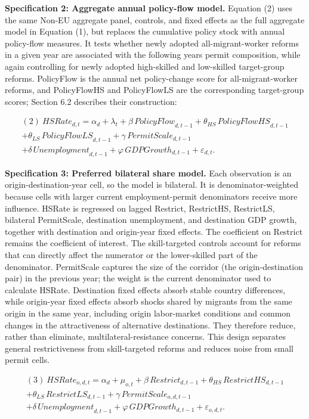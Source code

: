\documentclass[11pt,a4paper]{article}
\begin{document}
\textbf{Specification 2: Aggregate annual policy-flow model.} Equation
(2) uses the same Non-EU aggregate panel, controls, and fixed effects as
the full aggregate model in Equation (1), but replaces the cumulative
policy stock with annual policy-flow measures. It tests whether newly
adopted all-migrant-worker reforms in a given year are associated with
the following year\textquotesingle s permit composition, while again
controlling for newly adopted high-skilled and low-skilled target-group
reforms. PolicyFlow is the annual net policy-change score for
all-migrant-worker reforms, and PolicyFlowHS and PolicyFlowLS are the
corresponding target-group scores; Section 6.2 describes their
construction:

\[\begin{array}{r}
(2)\ {HSRate}_{d,t} = \alpha_{d} + \lambda_{t} + \beta\,{PolicyFlow}_{d,t - 1} + \theta_{HS}\,{PolicyFlowHS}_{d,t - 1} \\
 + \theta_{LS}\,{PolicyFlowLS}_{d,t - 1} + \gamma\,{PermitScale}_{d,t - 1} \\
 + \delta\,{Unemployment}_{d,t - 1} + \varphi\,{GDPGrowth}_{d,t - 1} + \varepsilon_{d,t}.
\end{array}\]

\textbf{Specification 3: Preferred bilateral share model.} Each
observation is an origin-destination-year cell, so the model is
bilateral. It is denominator-weighted because cells with larger current
employment-permit denominators receive more influence. HSRate is
regressed on lagged Restrict, RestrictHS, RestrictLS, bilateral
PermitScale, destination unemployment, and destination GDP growth,
together with destination and origin-year fixed effects. The coefficient
on Restrict remains the coefficient of interest. The skill-targeted
controls account for reforms that can directly affect the numerator or
the lower-skilled part of the denominator. PermitScale captures the size
of the corridor (the origin-destination pair) in the previous year; the
weight is the current denominator used to calculate HSRate. Destination
fixed effects absorb stable country differences, while origin-year fixed
effects absorb shocks shared by migrants from the same origin in the
same year, including origin labor-market conditions and common changes
in the attractiveness of alternative destinations. They therefore
reduce, rather than eliminate, multilateral-resistance concerns. This
design separates general restrictiveness from skill-targeted reforms and
reduces noise from small permit cells.

\[\begin{array}{r}
(3)\ {HSRate}_{o,d,t} = \alpha_{d} + \mu_{o,t} + \beta\,{Restrict}_{d,t - 1} + \theta_{HS}\,{RestrictHS}_{d,t - 1} \\
 + \theta_{LS}\,{RestrictLS}_{d,t - 1} + \gamma\,{PermitScale}_{o,d,t - 1} \\
 + \delta\,{Unemployment}_{d,t - 1} + \varphi\,{GDPGrowth}_{d,t - 1} + \varepsilon_{o,d,t}.
\end{array}\]
\end{document}
